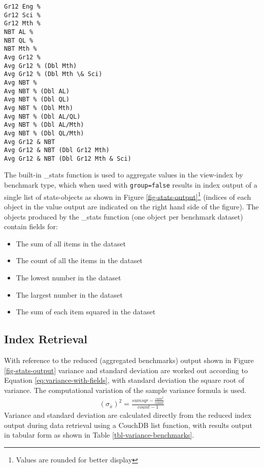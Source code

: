 \begin{verbatim}
Gr12 Eng % 
Gr12 Sci % 
Gr12 Mth % 
NBT AL % 
NBT QL % 
NBT Mth % 
Avg Gr12 % 
Avg Gr12 % (Dbl Mth)
Avg Gr12 % (Dbl Mth \& Sci)
Avg NBT % 
Avg NBT % (Dbl AL)
Avg NBT % (Dbl QL)
Avg NBT % (Dbl Mth)
Avg NBT % (Dbl AL/QL)
Avg NBT % (Dbl AL/Mth)
Avg NBT % (Dbl QL/Mth)
Avg Gr12 & NBT 
Avg Gr12 & NBT (Dbl Gr12 Mth)
Avg Gr12 & NBT (Dbl Gr12 Mth & Sci)
\end{verbatim}

The built-in \_stats function is used to aggregate values in the view-index by benchmark type, which when used with \texttt{group=false} results in index output of a single list of stats-objects as shown in Figure \ref{fig-stats-output}\footnote{Values are rounded for better display} (indices of each object in the value output are indicated on the right hand side of the figure). The objects produced by the \_stats function (one object per benchmark dataset) contain fields for:

\begin{itemize}
  \item The sum of all items in the dataset
  \item The count of all the items in the dataset
  \item The lowest number in the dataset
  \item The largest number in the dataset
  \item The sum of each item squared in the dataset
\end{itemize}



\subsection{Index Retrieval}
With reference to the reduced (aggregated benchmarks) output shown in Figure \ref{fig-stats-output} variance and standard deviation are worked out according to Equation \ref{eq:variance-with-fields}, with standard deviation the square root of variance. The computational variation of the sample variance formula is used.
\begin{align}
  (\sigma_{\overline{x}})^{2} =  \frac{sumsqr - \frac{sum^2}{count}}{count - 1}\label{eq:variance-with-fields}
\end{align}
Variance and standard deviation are calculated directly from the reduced index output during data retrieval using a CouchDB list function, with results output in tabular form as shown in Table \ref{tbl-variance-benchmarks}.

